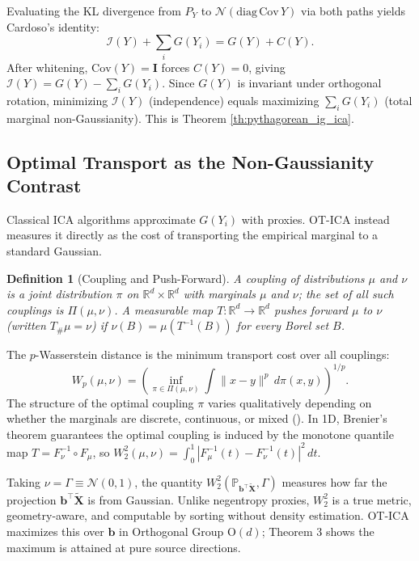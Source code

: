 \documentclass[accepted]{tpm2026} %
\newtheorem{definition}{Definition}
\begin{document}
Evaluating the KL divergence from $P_Y$ to $\mathcal{N}(\mathrm{diag\,Cov}\,Y)$ via both paths yields Cardoso's identity:
\begin{equation}
    \mathscr{I}(Y) + \sum_{i} G(Y_i) = G(Y) + C(Y).
\end{equation}
After whitening, $\mathrm{Cov}(Y) = \mathbf{I}$ forces $C(Y) = 0$, giving $\mathscr{I}(Y) = G(Y) - \sum_i G(Y_i)$.
Since $G(Y)$ is invariant under orthogonal rotation, minimizing $\mathscr{I}(Y)$ (independence) equals maximizing $\sum_i G(Y_i)$ (total marginal non-Gaussianity). This is Theorem \ref{th:pythagorean_ig_ica}.

\subsection{Optimal Transport as the Non-Gaussianity Contrast}

Classical ICA algorithms approximate $G(Y_i)$ with proxies. OT-ICA instead measures it directly as the cost of transporting the empirical marginal to a standard Gaussian.

\begin{definition}[Coupling and Push-Forward]
A \emph{coupling} of distributions $\mu$ and $\nu$ is a joint distribution $\pi$ on $\mathbb{R}^d \times \mathbb{R}^d$ with marginals $\mu$ and $\nu$; the set of all such couplings is $\Pi(\mu,\nu)$.
A measurable map $T\colon\mathbb{R}^d\to\mathbb{R}^d$ \emph{pushes forward} $\mu$ to $\nu$ (written $T_\#\mu = \nu$) if $\nu(B) = \mu(T^{-1}(B))$ for every Borel set $B$.
\end{definition}

The $p$-Wasserstein distance is the minimum transport cost over all couplings:
\begin{equation}
    W_p(\mu,\nu) = \left(\inf_{\pi\in\Pi(\mu,\nu)} \int \|x-y\|^p\,d\pi(x,y)\right)^{1/p}.
\end{equation}
The structure of the optimal coupling $\pi$ varies qualitatively depending on whether the marginals are discrete, continuous, or mixed (\cite{peyre2019computational}).
In 1D, Brenier's theorem guarantees the optimal coupling is induced by the monotone quantile map $T = F_\nu^{-1}\circ F_\mu$, so $W_2^2(\mu,\nu) = \int_0^1 |F_\mu^{-1}(t) - F_\nu^{-1}(t)|^2\,dt$.

Taking $\nu = \Gamma \equiv \mathcal{N}(0,1)$, the quantity $W_2^2(\mathbb{P}_{\mathbf{b}^\top\widetilde{\mathbf{X}}},\Gamma)$ measures how far the projection $\mathbf{b}^\top\widetilde{\mathbf{X}}$ is from Gaussian.
Unlike negentropy proxies, $W_2^2$ is a true metric, geometry-aware, and computable by sorting without density estimation.
OT-ICA maximizes this over $\mathbf{b}$ in Orthogonal Group $\mathrm{O}(d)$; Theorem 3 shows the maximum is attained at pure source directions.
\end{document}
